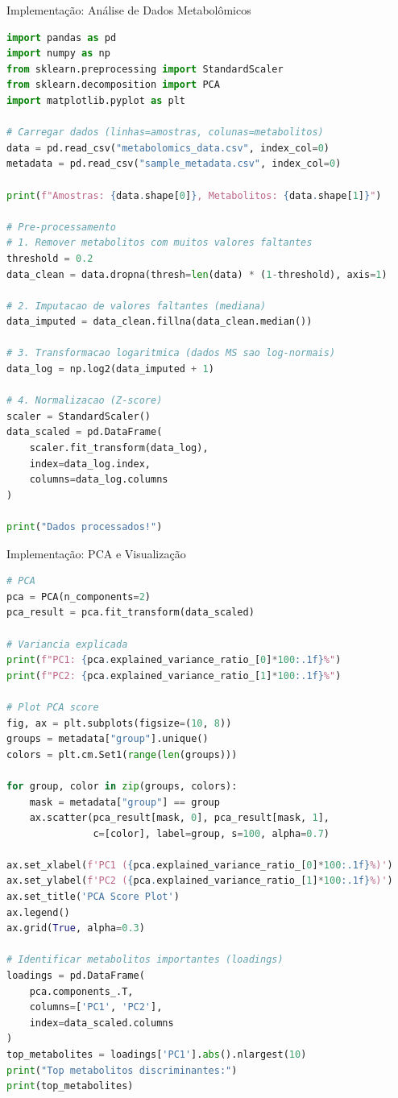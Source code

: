 \begin{frame}[fragile]{Implementação: Análise de Dados Metabolômicos}
\begin{lstlisting}[language=Python, caption=Processamento básico de dados, basicstyle=\ttfamily\footnotesize]
import pandas as pd
import numpy as np
from sklearn.preprocessing import StandardScaler
from sklearn.decomposition import PCA
import matplotlib.pyplot as plt

# Carregar dados (linhas=amostras, colunas=metabolitos)
data = pd.read_csv("metabolomics_data.csv", index_col=0)
metadata = pd.read_csv("sample_metadata.csv", index_col=0)

print(f"Amostras: {data.shape[0]}, Metabolitos: {data.shape[1]}")

# Pre-processamento
# 1. Remover metabolitos com muitos valores faltantes
threshold = 0.2
data_clean = data.dropna(thresh=len(data) * (1-threshold), axis=1)

# 2. Imputacao de valores faltantes (mediana)
data_imputed = data_clean.fillna(data_clean.median())

# 3. Transformacao logaritmica (dados MS sao log-normais)
data_log = np.log2(data_imputed + 1)

# 4. Normalizacao (Z-score)
scaler = StandardScaler()
data_scaled = pd.DataFrame(
    scaler.fit_transform(data_log),
    index=data_log.index,
    columns=data_log.columns
)

print("Dados processados!")
\end{lstlisting}
\end{frame}

\begin{frame}[fragile]{Implementação: PCA e Visualização}
\begin{lstlisting}[language=Python, caption=Análise de componentes principais, basicstyle=\ttfamily\footnotesize]
# PCA
pca = PCA(n_components=2)
pca_result = pca.fit_transform(data_scaled)

# Variancia explicada
print(f"PC1: {pca.explained_variance_ratio_[0]*100:.1f}%")
print(f"PC2: {pca.explained_variance_ratio_[1]*100:.1f}%")

# Plot PCA score
fig, ax = plt.subplots(figsize=(10, 8))
groups = metadata["group"].unique()
colors = plt.cm.Set1(range(len(groups)))

for group, color in zip(groups, colors):
    mask = metadata["group"] == group
    ax.scatter(pca_result[mask, 0], pca_result[mask, 1],
               c=[color], label=group, s=100, alpha=0.7)

ax.set_xlabel(f'PC1 ({pca.explained_variance_ratio_[0]*100:.1f}%)')
ax.set_ylabel(f'PC2 ({pca.explained_variance_ratio_[1]*100:.1f}%)')
ax.set_title('PCA Score Plot')
ax.legend()
ax.grid(True, alpha=0.3)

# Identificar metabolitos importantes (loadings)
loadings = pd.DataFrame(
    pca.components_.T,
    columns=['PC1', 'PC2'],
    index=data_scaled.columns
)
top_metabolites = loadings['PC1'].abs().nlargest(10)
print("Top metabolitos discriminantes:")
print(top_metabolites)
\end{lstlisting}
\end{frame}


